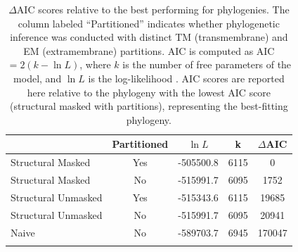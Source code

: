 \documentclass[fleqn,10pt]{wlpeerj}
\begin{document}
\vspace*{5cm}

\begin{table}[htbp]
	\centering
	\begin{tabular}{l c l l c}
		\hline\noalign{\smallskip}
		\multicolumn{1}{c}{MSA} & \multicolumn{1}{c}{Partitioned} & \multicolumn{1}{c}{$\ln L$} & \multicolumn{1}{c}{k} & \multicolumn{1}{l}{$\Delta$AIC} \\
		\hline\noalign{\smallskip}
		Structural Masked & Yes & -505500.8 & 6115 & 0 \\
		Structural Masked & No & -515991.7 & 6095 & 1752 \\  
		Structural Unmasked & Yes & -515343.6 & 6115 & 19685 \\
		Structural Unmasked & No & -515991.7 & 6095 & 20941 \\ 
		Naive & No &  -589703.7 & 6945 & 170047 \\
		\noalign{\smallskip}\hline\noalign{\smallskip} 
	\end{tabular}
	\caption{\label{tab:phylo_AIC} $\Delta$AIC scores relative to the best performing for phylogenies. The column labeled ``Partitioned'' indicates whether phylogenetic inference was conducted with distinct TM (transmembrane) and EM (extramembrane) partitions. AIC is computed as AIC $= 2(k - \ln L)$, where $k$ is the number of free parameters of the model, and $\ln L$ is the log-likelihood \citep{Akaike1974,BurnhamAnderson2004}. AIC scores are reported here relative to the phylogeny with the lowest AIC score (structural masked with partitions), representing the best-fitting phylogeny.}
\end{table}


\newpage
\end{document}
